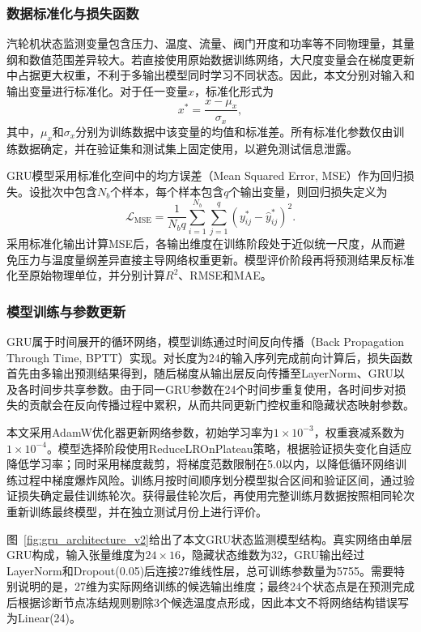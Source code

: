 \subsubsection{数据标准化与损失函数}

汽轮机状态监测变量包含压力、温度、流量、阀门开度和功率等不同物理量，其量纲和数值范围差异较大。若直接使用原始数据训练网络，大尺度变量会在梯度更新中占据更大权重，不利于多输出模型同时学习不同状态。因此，本文分别对输入和输出变量进行标准化。对于任一变量$x$，标准化形式为
\begin{equation}
    x^{*}=\frac{x-\mu_x}{\sigma_x},
\end{equation}
其中，$\mu_x$和$\sigma_x$分别为训练数据中该变量的均值和标准差。所有标准化参数仅由训练数据确定，并在验证集和测试集上固定使用，以避免测试信息泄露。

GRU模型采用标准化空间中的均方误差（Mean Squared Error, MSE）作为回归损失。设批次中包含$N_b$个样本，每个样本包含$q$个输出变量，则回归损失定义为
\begin{equation}
    \mathcal{L}_{\mathrm{MSE}}=
    \frac{1}{N_b q}
    \sum_{i=1}^{N_b}
    \sum_{j=1}^{q}
    \left(
    y^{*}_{ij}-\hat{y}^{*}_{ij}
    \right)^2.
    \label{eq:mse_loss_v2}
\end{equation}
采用标准化输出计算MSE后，各输出维度在训练阶段处于近似统一尺度，从而避免压力与温度量纲差异直接主导网络权重更新。模型评价阶段再将预测结果反标准化至原始物理单位，并分别计算$R^2$、RMSE和MAE。

\subsubsection{模型训练与参数更新}

GRU属于时间展开的循环网络，模型训练通过时间反向传播（Back Propagation Through Time, BPTT）实现。对长度为24的输入序列完成前向计算后，损失函数首先由多输出预测结果得到，随后梯度从输出层反向传播至LayerNorm、GRU以及各时间步共享参数。由于同一GRU参数在24个时间步重复使用，各时间步对损失的贡献会在反向传播过程中累积，从而共同更新门控权重和隐藏状态映射参数。

本文采用AdamW优化器更新网络参数，初始学习率为$1\times10^{-3}$，权重衰减系数为$1\times10^{-4}$。模型选择阶段使用ReduceLROnPlateau策略，根据验证损失变化自适应降低学习率；同时采用梯度裁剪，将梯度范数限制在5.0以内，以降低循环网络训练过程中梯度爆炸风险。训练月按时间顺序划分模型拟合区间和验证区间，通过验证损失确定最佳训练轮次。获得最佳轮次后，再使用完整训练月数据按照相同轮次重新训练最终模型，并在独立测试月份上进行评价。

图~\ref{fig:gru_architecture_v2}给出了本文GRU状态监测模型结构。真实网络由单层GRU构成，输入张量维度为$24\times16$，隐藏状态维数为32，GRU输出经过LayerNorm和Dropout(0.05)后连接27维线性层，总可训练参数量为5755。需要特别说明的是，27维为实际网络训练的候选输出维度；最终24个状态点是在预测完成后根据诊断节点冻结规则剔除3个候选温度点形成，因此本文不将网络结构错误写为Linear(24)。

